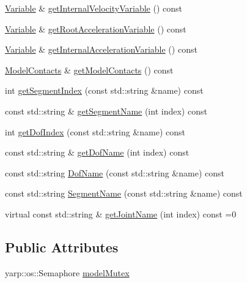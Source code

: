 \begin{DoxyCompactItemize}
\item 
\hyperlink{classocra_1_1Variable}{Variable} \& \hyperlink{classocra_1_1Model_ae690f2e3d9822b3c192393add7af60a3}{get\+Internal\+Velocity\+Variable} () const
\item 
\hyperlink{classocra_1_1Variable}{Variable} \& \hyperlink{classocra_1_1Model_ae342ff99f5249d17014d30863ff7857c}{get\+Root\+Acceleration\+Variable} () const
\item 
\hyperlink{classocra_1_1Variable}{Variable} \& \hyperlink{classocra_1_1Model_a4a95124245b13fe015c1a487dcbb8868}{get\+Internal\+Acceleration\+Variable} () const
\item 
\hyperlink{classocra_1_1ModelContacts}{Model\+Contacts} \& \hyperlink{classocra_1_1Model_a47362fe2f99287f555bbdb186d021823}{get\+Model\+Contacts} () const
\item 
int \hyperlink{classocra_1_1Model_a0043ea00ff58fc52bc2d8f54d5fb5400}{get\+Segment\+Index} (const std\+::string \&name) const
\item 
const std\+::string \& \hyperlink{classocra_1_1Model_ac21f88edd570d8d012e8e20b7ddc20c4}{get\+Segment\+Name} (int index) const
\item 
int \hyperlink{classocra_1_1Model_a070d9fa513218ca3f9fa8b2690563482}{get\+Dof\+Index} (const std\+::string \&name) const
\item 
const std\+::string \& \hyperlink{classocra_1_1Model_ad64d41ddb52236bee343d27572cd7020}{get\+Dof\+Name} (int index) const
\item 
const std\+::string \hyperlink{classocra_1_1Model_a12d3de75b9a3825f547e860f4318d4cd}{Dof\+Name} (const std\+::string \&name) const
\item 
const std\+::string \hyperlink{classocra_1_1Model_ad3f2a303f3120035780e7f4ad457b902}{Segment\+Name} (const std\+::string \&name) const
\item 
virtual const std\+::string \& \hyperlink{classocra_1_1Model_ac88c445f37e5bf7302aa19b8e986013b}{get\+Joint\+Name} (int index) const =0
\end{DoxyCompactItemize}
\subsection*{Public Attributes}
\begin{DoxyCompactItemize}
\item 
yarp\+::os\+::\+Semaphore \hyperlink{classocra_1_1Model_a45b4c8b4b6480355f2abb06bb55f7146}{model\+Mutex}
\end{DoxyCompactItemize}
